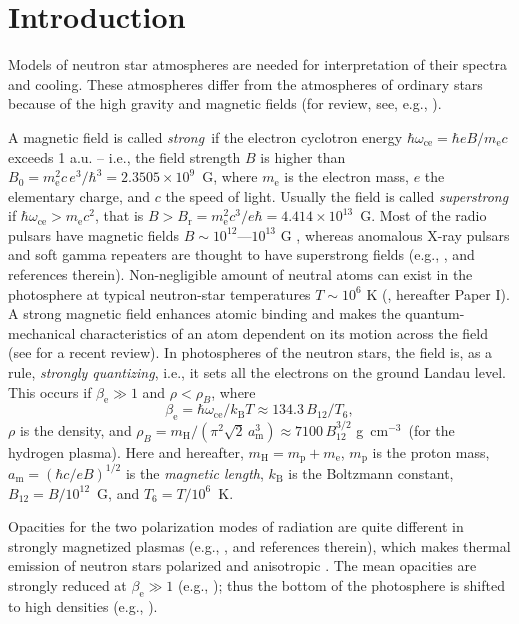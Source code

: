 \documentclass{emulateapj}
\newcommand{\gcc}{\mbox{g cm$^{-3}$}}
\newcommand{\beq}{\begin{equation}}
\newcommand{\eeq}{\end{equation}}
\newcommand{\mel}{m_\mathrm{e}}
\newcommand{\mpr}{m_\mathrm{p}}
\newcommand{\mH}{m_\mathrm{H}}
\newcommand{\am}{a_\mathrm{m}}
\newcommand{\omc}{\omega_\mathrm{ce}}
\newcommand{\kB}{k_\mathrm{B}}
\begin{document}
                   
\section{Introduction}
\label{sect-intro}
%
Models of neutron star atmospheres are needed for 
interpretation of their spectra and cooling. 
These atmospheres 
differ from the atmospheres of ordinary stars
because of the high gravity and magnetic fields
(for review, see, e.g., \citealp{Pavlov95,elounda}).

A magnetic field is called \emph{strong}\
if the electron cyclotron energy 
$\hbar\omc=\hbar eB/\mel c$
exceeds 1 a.u. -- i.e., the field strength $B$
is higher than $B_0=\mel^2 c\, e^3/\hbar^3
= 2.3505\times10^9$~G,
where $\mel$ is the electron mass, $e$ the elementary charge,
and $c$ the speed of light. Usually the field
 is called \emph{superstrong}
if $\hbar\omc > \mel c^2$,
that is $B > B_\mathrm{r}=\mel^2 c^3/e\hbar
= 4.414\times10^{13}$~G.
Most of the radio pulsars have
magnetic fields $B \sim 10^{12}$---$10^{13}$ G 
\citep*{tml93}, 
whereas anomalous
X-ray pulsars and soft gamma repeaters  
are thought to have superstrong fields (e.g., 
\citealp{mereghetti01,thompson00},
and references therein). 
Non-negligible amount of neutral atoms 
can exist in the photosphere
at typical neutron-star temperatures $T \sim 10^6$ K
(\citealp*{PCS99}, 
hereafter Paper I).
A strong magnetic field enhances atomic binding 
and makes the quantum-mechanical characteristics
of an atom dependent 
on its motion across the field 
(see \citealp{Lai01} for a recent review).
In photospheres of the neutron stars,
the field is, as a rule, \emph{strongly quantizing}, i.e., it sets
all the electrons on the ground Landau level. 
This occurs if $\beta_\mathrm{e} \gg 1$
and $\rho<\rho_B$,
where
\beq
   \beta_\mathrm{e} = \hbar\omc/\kB T
   \approx 134.3\,B_{12}/T_6 ,
\label{beta-e}
\eeq
 $\rho$ is the density, and
$\rho_B = \mH/(\pi^2\sqrt{2}\,\am^3)
\approx 7100\,B_{12}^{3/2}$ \gcc\ (for the hydrogen plasma).
Here and hereafter, $\mH = \mpr+\mel$,
$\mpr$ is the proton mass,  $\am=(\hbar c/eB)^{1/2}$
is the \emph{magnetic length},
 $\kB$ is the Boltzmann constant,
$B_{12}=B/10^{12}$~G, and $T_6=T/10^6$~K.

Opacities for the two polarization modes of radiation
are quite different in strongly magnetized plasmas (e.g., 
\citealp{Pavlov95},
and references therein),
which makes thermal emission of neutron stars polarized and
anisotropic \citep{Zavlin95}.
The mean opacities are strongly reduced at $\beta_\mathrm{e}\gg1$
(e.g., \citealp{silyak});
thus the bottom of the photosphere is shifted to high densities 
(e.g., \citealp{Pavlov95,LS97}).
\end{document}
